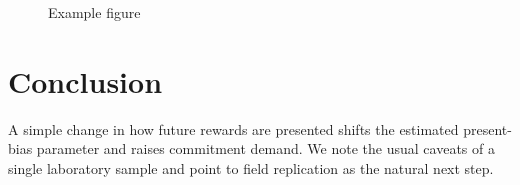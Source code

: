 \documentclass[
    fontsize=12pt,DIV=10,fleqn,
    letterpaper,oneside,paper=portrait,
]{scrartcl}
\begin{document}
\begin{figure}\centering
  \caption{Example figure\label{fig:example}}
\end{figure}

%
%
%

\section{Conclusion}\label{sec:conclusion}

A simple change in how future rewards are presented shifts the estimated
present-bias parameter and raises commitment demand. We note the usual caveats
of a single laboratory sample and point to field replication as the natural
next step.

\vspace{1\baselineskip}

{\RaggedRight \printbibliography}


%


\clearpage
{} %
\normalfont %
\linespread{1}\selectfont %
\end{document}
